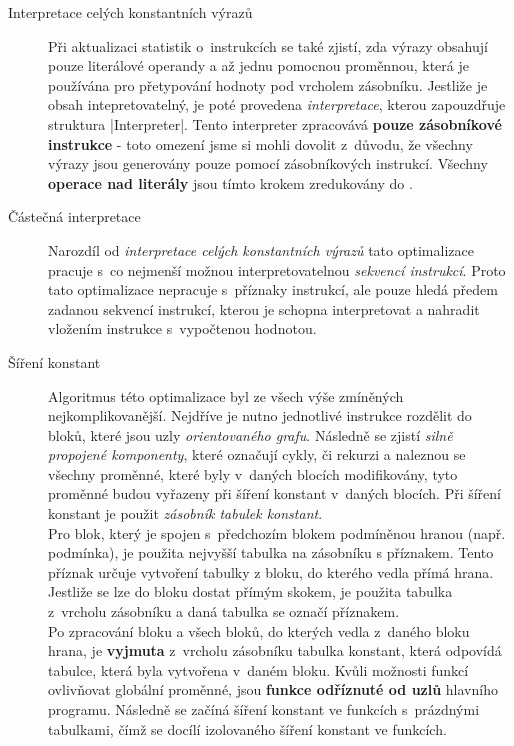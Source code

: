 \begin{description}
    \item[Interpretace celých konstantních výrazů] Při aktualizaci statistik o~instrukcích se také zjistí, zda výrazy obsahují pouze literálové operandy a až jednu pomocnou proměnnou, která je používána pro přetypování hodnoty pod vrcholem zásobníku. Jestliže je obsah intepretovatelný, je poté provedena \emph{interpretace}, kterou zapouzdřuje struktura \ic|Interpreter|. Tento interpreter zpracovává \textbf{pouze zásobníkové instrukce} - toto omezení jsme si mohli dovolit z~důvodu, že všechny výrazy jsou generovány pouze pomocí zásobníkových instrukcí. Všechny \textbf{operace nad literály} jsou tímto krokem zredukovány do .
    
    \item[Částečná interpretace] Narozdíl od \emph{interpretace celých konstantních výrazů} tato optimalizace pracuje s~co nejmenší možnou interpretovatelnou \emph{sekvencí instrukcí}. Proto tato optimalizace nepracuje s~příznaky instrukcí, ale pouze hledá předem zadanou sekvencí instrukcí, kterou je schopna interpretovat a nahradit vložením instrukce s~vypočtenou hodnotou.
    
    \item[Šíření konstant] Algoritmus této optimalizace byl ze všech výše zmíněných nejkomplikovanější. Nejdříve je nutno jednotlivé instrukce rozdělit do bloků, které jsou uzly \emph{orientovaného grafu}. Následně se zjistí \emph{silně propojené komponenty}, které označují cykly, či rekurzi a naleznou se všechny proměnné, které byly v~daných blocích modifikovány, tyto proměnné budou vyřazeny při šíření konstant v~daných blocích. Při šíření konstant je použit \emph{zásobník tabulek konstant}. \\
    Pro blok, který je spojen s~předchozím blokem podmíněnou hranou (např. podmínka), je použita nejvyšší tabulka na zásobníku s příznakem. Tento příznak určuje vytvoření tabulky z bloku, do kterého vedla přímá hrana.
    Jestliže se lze do bloku dostat přímým skokem, je použita tabulka z~vrcholu zásobníku a daná tabulka se označí příznakem. \\Po zpracování bloku a všech bloků, do kterých vedla z~daného bloku hrana, je \textbf{vyjmuta} z~vrcholu zásobníku tabulka konstant, která odpovídá tabulce, která byla vytvořena v~daném bloku. Kvůli možnosti funkcí ovlivňovat globální proměnné, jsou \textbf{funkce odříznuté od uzlů} hlavního programu. Následně se začíná šíření konstant ve funkcích s~prázdnými tabulkami, čímž se docílí izolovaného šíření konstant ve funkcích.
\end{description}

